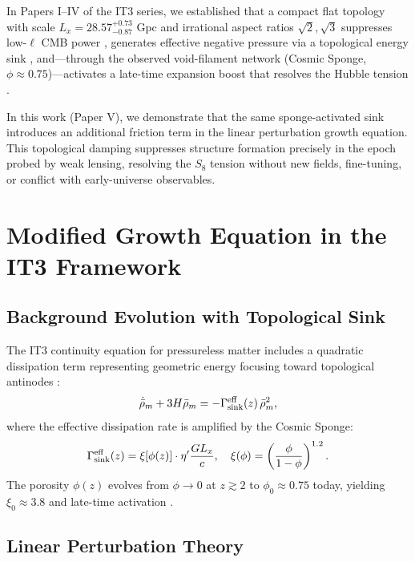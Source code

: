 \documentclass[12pt,a4paper]{article}
\begin{document}
In Papers I--IV of the IT3 series, we established that a compact flat topology with scale $L_x = 28.57^{+0.73}_{-0.87}$ Gpc and irrational aspect ratios $\sqrt{2}, \sqrt{3}$ suppresses low-$\ell$ CMB power \citep{Logvinovich2026a}, generates effective negative pressure via a topological energy sink \citep{Logvinovich2026b}, and—through the observed void-filament network (Cosmic Sponge, $\phi \approx 0.75$)—activates a late-time expansion boost that resolves the Hubble tension \citep{Logvinovich2026c, Logvinovich2026d}. 

In this work (Paper V), we demonstrate that the same sponge-activated sink introduces an additional friction term in the linear perturbation growth equation. This topological damping suppresses structure formation precisely in the epoch probed by weak lensing, resolving the $S_8$ tension without new fields, fine-tuning, or conflict with early-universe observables.

\section{Modified Growth Equation in the IT3 Framework}

\subsection{Background Evolution with Topological Sink}

The IT3 continuity equation for pressureless matter includes a quadratic dissipation term representing geometric energy focusing toward topological antinodes \citep{Logvinovich2026b}:
\begin{equation}
\dot{\bar{\rho}}_m + 3H\bar{\rho}_m = -\Gamma_{\rm sink}^{\rm eff}(z)\,\bar{\rho}_m^2,
\label{eq:continuity_bg}
\end{equation}
where the effective dissipation rate is amplified by the Cosmic Sponge:
\begin{equation}
\Gamma_{\rm sink}^{\rm eff}(z) = \xi[\phi(z)] \cdot \eta' \frac{G L_x}{c}, \quad
\xi(\phi) = \left(\frac{\phi}{1-\phi}\right)^{1.2}.
\label{eq:Gamma_eff}
\end{equation}
The porosity $\phi(z)$ evolves from $\phi \to 0$ at $z \gtrsim 2$ to $\phi_0 \approx 0.75$ today, yielding $\xi_0 \approx 3.8$ and late-time activation \citep{Logvinovich2026c}.

\subsection{Linear Perturbation Theory}
\end{document}
